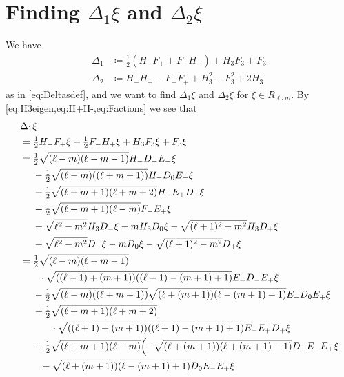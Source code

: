 \section{\texorpdfstring{Finding $\Delta_1 \xi$ and $\Delta_2 \xi$}{Finding Delta\_1 xi and Delta\_2 xi}}\label{sec:Deltacalc}

We have
\begin{align*}
  \Delta_1 &\coloneqq \tfrac{1}{2}(H_-F_++F_-H_+) + H_3F_3 + F_3 \\
  \Delta_2 &\coloneqq H_-H_+ - F_-F_+ + H_3^2 - F_3^2 + 2H_3
\end{align*}
as in \cref{eq:Deltasdef}, and we want to find $\Delta_1\xi$ and $\Delta_2 \xi$ for $\xi\in R_{\ell,m}$. By \cref{eq:H3eigen,eq:H+H-,eq:Factions} we see that 
\begin{align*}
  &  \Delta_1 \xi \\ 
  &= \tfrac{1}{2}H_-F_+\xi+\tfrac{1}{2}F_-H_+\xi + H_3F_3\xi + F_3\xi \\
  &= \tfrac{1}{2}\sqrt{(\ell-m)(\ell-m-1)}H_-D_-E_+\xi \\*
  &\phantom{{}={}}{} - \tfrac{1}{2}\sqrt{(\ell-m)((\ell+m+1))}H_-D_0E_+\xi \\*
  &\phantom{{}={}}{} + \tfrac{1}{2}\sqrt{(\ell+m+1)(\ell+m+2)}H_-E_+D_+\xi \\*
  &\phantom{{}={}}{} + \tfrac{1}{2}\sqrt{(\ell+m+1)(\ell-m)}F_-E_+\xi \\*
  &\phantom{{}={}}{} + \sqrt{\ell^2-m^2} H_3D_-\xi - m H_3D_0\xi - \sqrt{(\ell+1)^2-m^2}H_3D_+\xi \\*
  &\phantom{{}={}}{} + \sqrt{\ell^2-m^2} D_-\xi - m D_0\xi - \sqrt{(\ell+1)^2-m^2}D_+\xi \\
  &= \tfrac{1}{2}\sqrt{(\ell-m)(\ell-m-1)} \\*
  &\phantom{{}={}\tfrac{1}{2}} \cdot\sqrt{((\ell-1)+(m+1))((\ell-1)-(m+1)+1)} E_-D_-E_+\xi \\*
  &\phantom{{}={}}{} - \tfrac{1}{2}\sqrt{(\ell-m)((\ell+m+1))}\sqrt{(\ell+(m+1))(\ell-(m+1)+1)}E_-D_0E_+\xi \\*
  &\phantom{{}={}}{} + \tfrac{1}{2}\sqrt{(\ell+m+1)(\ell+m+2)}\\*
  &\phantom{{}={}+\tfrac{1}{2}} \cdot \sqrt{((\ell+1)+(m+1))((\ell+1)-(m+1)+1)}E_-E_+D_+\xi \\*
  &\phantom{{}={}}{} + \tfrac{1}{2}\sqrt{(\ell+m+1)(\ell-m)}\Bigl(-\sqrt{(\ell+(m+1))(\ell+(m+1)-1)}D_-E_-E_+\xi \\*
  &\phantom{{}={}()}{} - \sqrt{(\ell+(m+1))(\ell-(m+1)+1)}D_0E_-E_+\xi \\*

\end{align*}

